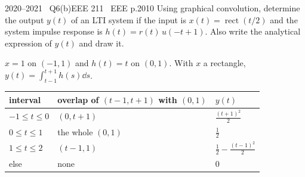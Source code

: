 \begin{qcard}{2020--2021 \textbullet\ Q6(b)}{EEE 211 \textbullet\ EEE p.20}{10}
Using graphical convolution, determine the output $y(t)$ of an LTI system if the input is $x(t)=\operatorname{rect}(t/2)$ and the system impulse response is $h(t)=r(t)\,u(-t+1)$. Also write the analytical expression of $y(t)$ and draw it.
\end{qcard}
\begin{solution}
$x=1$ on $(-1,1)$ and $h(t)=t$ on $(0,1)$. With $x$ a rectangle, $y(t)=\int_{t-1}^{t+1}h(s)\dd s$.
\begin{center}\small\begin{tabular}{@{}lll@{}}\toprule interval & overlap of $(t-1,t+1)$ with $(0,1)$ & $y(t)$\\\midrule
$-1\le t\le0$ & $(0,t+1)$ & $\frac{(t+1)^2}{2}$\\
$0\le t\le1$ & the whole $(0,1)$ & $\frac12$\\
$1\le t\le2$ & $(t-1,1)$ & $\frac12-\frac{(t-1)^2}{2}$\\
else & none & $0$\\\bottomrule\end{tabular}\end{center}
\begin{center}\end{center}
\end{solution}

